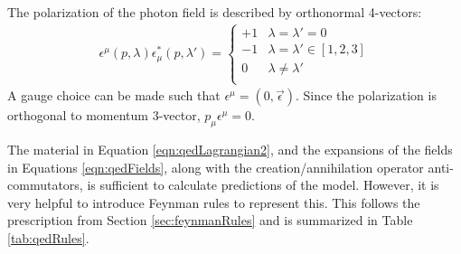 The polarization of the photon field is described by orthonormal 4-vectors:
\begin{equation}\begin{split}
\epsilon^\mu(p,\lambda)\epsilon^*_\mu(p,\lambda') = \begin{cases}
    +1 &\lambda=\lambda'=0\\
    -1 &\lambda=\lambda'\in[1,2,3]\\
     0 &\lambda\ne\lambda'\\
\end{cases}
\end{split}\end{equation}
A gauge choice can be made such that $\epsilon^\mu=(0,\vec{\epsilon})$. 
Since the polarization is orthogonal to momentum 3-vector, $p_\mu\epsilon^\mu=0$.

The material in Equation \ref{eqn:qedLagrangian2}, and the expansions of the fields in Equations \ref{eqn:qedFields}, along with the creation/annihilation operator anti-commutators, is sufficient to calculate predictions of the model.
However, it is very helpful to introduce Feynman rules to represent this.
This follows the prescription from Section \ref{sec:feynmanRules} and is summarized in Table \ref{tab:qedRules}.



